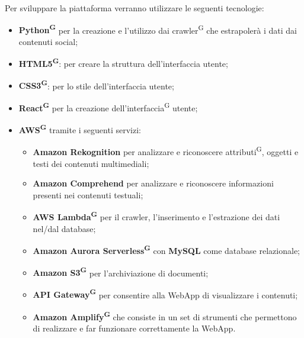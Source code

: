Per sviluppare la piattaforma verranno utilizzare le seguenti tecnologie:
\begin{itemize}
    \item \textbf{Python\textsuperscript{G}} per la creazione e l'utilizzo dai crawler\textsuperscript{G} che estrapolerà i dati dai contenuti social;
    \item \textbf{HTML5\textsuperscript{G}}: per creare la struttura dell'interfaccia utente;
    \item \textbf{CSS3\textsuperscript{G}}: per lo stile dell'interfaccia utente;
    \item \textbf{React\textsuperscript{G}} per la creazione dell'interfaccia\textsuperscript{G} utente;
    \item \textbf{AWS\textsuperscript{G}} tramite i seguenti servizi:
    \begin{itemize}
    	\item \textbf{Amazon Rekognition} per analizzare e riconoscere attributi\textsuperscript{G}{}, oggetti e testi dei contenuti multimediali;
    	\item \textbf{Amazon Comprehend} per analizzare e riconoscere informazioni presenti nei contenuti testuali;
    	\item \textbf{AWS Lambda\textsuperscript{G}} per il crawler, l'inserimento e l'estrazione dei dati nel/dal database;
    	\item \textbf{Amazon Aurora Serverless\textsuperscript{G}} con \textbf{MySQL} come database relazionale;
    	\item \textbf{Amazon S3\textsuperscript{G}} per l'archiviazione di documenti;
    	\item \textbf{API Gateway\textsuperscript{G}} per consentire alla WebApp di visualizzare i contenuti;
    	\item \textbf{Amazon Amplify\textsuperscript{G}} che consiste in un set di strumenti che permettono di realizzare e far funzionare correttamente la WebApp.
	\end{itemize}
  \end{itemize}
